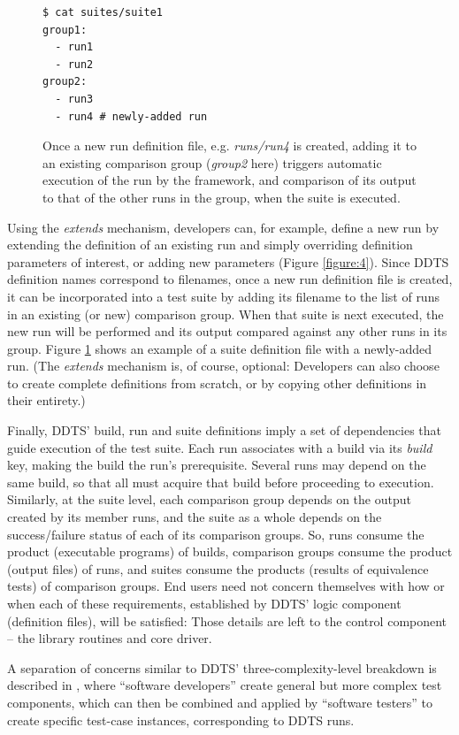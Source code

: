 \documentclass[conference]{IEEEtran}
\begin{document}
\begin{figure}[!t]
{\small \begin{verbatim}
$ cat suites/suite1
group1:
  - run1
  - run2
group2:
  - run3
  - run4 # newly-added run
\end{verbatim} }
\caption{Once a new run definition file, e.g. \emph{runs/run4} is created, adding it to an existing comparison group (\emph{group2} here) triggers automatic execution of the run by the framework, and comparison of its output to that of the other runs in the group, when the suite is executed.}
\label{figure:5}
\end{figure}

Using the \emph{extends} mechanism, developers can, for example, define a new run by extending the definition of an existing run and simply overriding definition parameters of interest, or adding new parameters (Figure \ref{figure:4}). Since DDTS definition names correspond to filenames, once a new run definition file is created, it can be incorporated into a test suite by adding its filename to the list of runs in an existing (or new) comparison group. When that suite is next executed, the new run will be performed and its output compared against any other runs in its group. Figure \ref{figure:5} shows an example of a suite definition file with a newly-added run. (The \emph{extends} mechanism is, of course, optional: Developers can also choose to create complete definitions from scratch, or by copying other definitions in their entirety.)

Finally, DDTS' build, run and suite definitions imply a set of dependencies that guide execution of the test suite. Each run associates with a build via its \emph{build} key, making the build the run's prerequisite. Several runs may depend on the same build, so that all must acquire that build before proceeding to execution. Similarly, at the suite level, each comparison group depends on the output created by its member runs, and the suite as a whole depends on the success/failure status of each of its comparison groups. So, runs consume the product (executable programs) of builds, comparison groups consume the product (output files) of runs, and suites consume the products (results of equivalence tests) of comparison groups. End users need not concern themselves with how or when each of these requirements, established by DDTS' logic component (definition files), will be satisfied: Those details are left to the control component -- the library routines and core driver.

A separation of concerns similar to DDTS' three-complexity-level breakdown is described in \cite{rest}, where ``software developers'' create general but more complex test components, which can then be combined and applied by ``software testers'' to create specific test-case instances, corresponding to DDTS runs.
\end{document}

